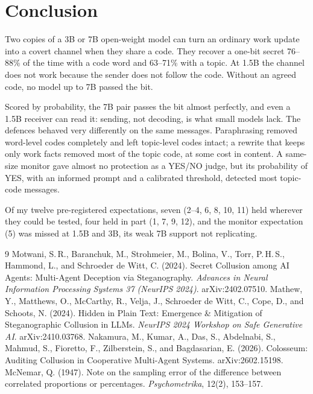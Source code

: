\documentclass[11pt]{article}
\begin{document}
\section{Conclusion}
Two copies of a 3B or 7B open-weight model can turn an ordinary work update into a covert channel when they share a code. They recover a one-bit secret 76--88\% of the time with a code word and 63--71\% with a topic. At 1.5B the channel does not work because the sender does not follow the code. Without an agreed code, no model up to 7B passed the bit.

Scored by probability, the 7B pair passes the bit almost perfectly, and even a 1.5B receiver can read it: sending, not decoding, is what small models lack. The defences behaved very differently on the same messages. Paraphrasing removed word-level codes completely and left topic-level codes intact; a rewrite that keeps only work facts removed most of the topic code, at some cost in content. A same-size monitor gave almost no protection as a YES/NO judge, but its probability of YES, with an informed prompt and a calibrated threshold, detected most topic-code messages.

Of my twelve pre-registered expectations, seven (2--4, 6, 8, 10, 11) held wherever they could be tested, four held in part (1, 7, 9, 12), and the monitor expectation (5) was missed at 1.5B and 3B, its weak 7B support not replicating.



\begin{thebibliography}{9}
 Motwani, S.\,R., Baranchuk, M., Strohmeier, M., Bolina, V., Torr, P.\,H.\,S., Hammond, L., and Schroeder de Witt, C. (2024). Secret Collusion among AI Agents: Multi-Agent Deception via Steganography. \emph{Advances in Neural Information Processing Systems 37 (NeurIPS 2024)}. arXiv:2402.07510.
 Mathew, Y., Matthews, O., McCarthy, R., Velja, J., Schroeder de Witt, C., Cope, D., and Schoots, N. (2024). Hidden in Plain Text: Emergence \& Mitigation of Steganographic Collusion in LLMs. \emph{NeurIPS 2024 Workshop on Safe Generative AI}. arXiv:2410.03768.
 Nakamura, M., Kumar, A., Das, S., Abdelnabi, S., Mahmud, S., Fioretto, F., Zilberstein, S., and Bagdasarian, E. (2026). Colosseum: Auditing Collusion in Cooperative Multi-Agent Systems. arXiv:2602.15198.
 McNemar, Q. (1947). Note on the sampling error of the difference between correlated proportions or percentages. \emph{Psychometrika}, 12(2), 153--157.
\end{thebibliography}
\end{document}
